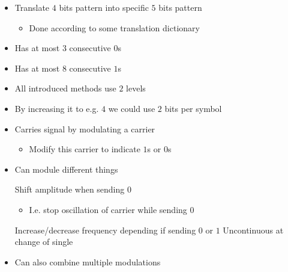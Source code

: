 \begin{itemize}
\begin{itemize}
\begin{itemize}
                \end{itemize}
                \begin{itemize}
                    \item Translate $4$ bits pattern into specific $5$ bits pattern
                        \begin{itemize}
                            \item Done according to some translation dictionary
                        \end{itemize}
                    \item Has at most $3$ consecutive $0$s
                    \item Has at most $8$ consecutive $1$s
                \end{itemize}
                \begin{itemize}
                    \item All introduced methods use $2$ levels
                    \item By increasing it to e.g. $4$ we could use $2$ bits per symbol 
                \end{itemize}
        \end{itemize}
        \begin{itemize}
            \item Carries signal by modulating a carrier
                \begin{itemize}
                     Some base signal oscillating at a desired frequency
                    \item Modify this carrier to indicate $1$s or $0$s
                \end{itemize}
            \item Can module different things
                \begin{itemize}
                     Shift amplitude when sending $0$
                        \begin{itemize}
                            \item I.e. stop oscillation of carrier while sending $0$
                        \end{itemize}
                     Increase/decrease frequency depending if sending $0$ or $1$
                      Uncontinuous at change of single
                \end{itemize}
            \item Can also combine multiple modulations
        \end{itemize}
\end{itemize}

